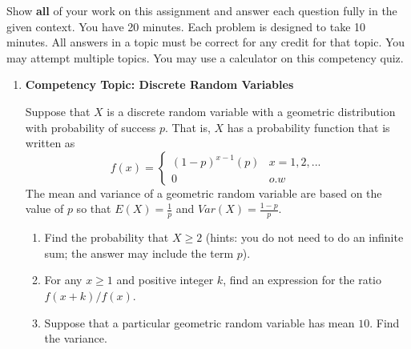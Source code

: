 \documentclass[11pt]{article}
\providecommand{\tightlist}{%
  \setlength{\itemsep}{0pt}\setlength{\parskip}{0pt}}
\begin{document}
\pagestyle{fancy} 

Show \textbf{all} of your work on this assignment and answer each question fully in the given context. You have 20 minutes. Each problem is designed to take 10 minutes. All answers in a topic must be correct for any credit for that topic. You may attempt multiple topics. You may use a calculator on this competency quiz. \\

\begin{enumerate}
\def\labelenumi{\arabic{enumi}.}
\item
  \textbf{Competency Topic: Discrete Random Variables}

  Suppose that \(X\) is a discrete random variable with a geometric
  distribution with probability of success \(p\). That is, \(X\) has a
  probability function that is written as
  \[ f(x) = \begin{cases} (1-p)^{x-1} (p) & x = 1, 2, ... \\ 0 & o.w \end{cases} \]
  The mean and variance of a geometric random variable are based on the
  value of \(p\) so that \(E(X) = \frac{1}{p}\) and
  \(Var(X) = \frac{1-p}{p}\).

  \begin{enumerate}
  \def\labelenumii{\alph{enumii}.}
  \tightlist
  \item
    Find the probability that \(X \ge 2\) (hints: you do not need to do
    an infinite sum; the answer may include the term \(p\)).
    \vspace{4cm}
  \item
    For any \(x \ge 1\) and positive integer \(k\), find an expression
    for the ratio \(f(x + k)/f(x)\). \vspace{4cm}
  \item
    Suppose that a particular geometric random variable has mean \(10\).
    Find the variance.
  \end{enumerate}
\end{enumerate}

\newpage
\end{document}

